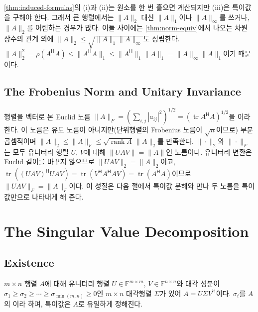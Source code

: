 \cref{thm:induced-formulas}의 (i)과 (ii)는 원소를 한 번 훑으면 계산되지만 (iii)은 특이값을 구해야 한다. 그래서 큰 행렬에서는 $\|A\|_2$ 대신 $\|A\|_1$이나 $\|A\|_\infty$를 쓰거나, $\|A\|_2$를 어림하는 경우가 많다. 이들 사이에는 \cref{thm:norm-equiv}에서 나오는 차원 상수의 관계 외에 $\|A\|_2\le\sqrt{\|A\|_1\|A\|_\infty}$도 성립한다. $\|A\|_2^2=\rho(A^{\mathsf H}A)\le\|A^{\mathsf H}A\|_1\le\|A^{\mathsf H}\|_1\|A\|_1=\|A\|_\infty\|A\|_1$이기 때문이다.

\subsection{The Frobenius Norm and Unitary Invariance}

행렬을 벡터로 본 Euclid 노름 $\|A\|_F=(\sum_{i,j}|a_{ij}|^2)^{1/2}=(\operatorname{tr}A^{\mathsf H}A)^{1/2}$을 이라 한다. 이 노름은 유도 노름이 아니지만(단위행렬의 Frobenius 노름이 $\sqrt n$이므로) 부분곱셈적이며 $\|A\|_2\le\|A\|_F\le\sqrt{\operatorname{rank}A}\,\|A\|_2$를 만족한다. $\|\cdot\|_2$와 $\|\cdot\|_F$는 모두 유니터리 행렬 $U$, $V$에 대해 $\|UAV\|=\|A\|$인  노름이다. 유니터리 변환은 Euclid 길이를 바꾸지 않으므로 $\|UAV\|_2=\|A\|_2$이고, $\operatorname{tr}((UAV)^{\mathsf H}UAV)=\operatorname{tr}(V^{\mathsf H}A^{\mathsf H}AV)=\operatorname{tr}(A^{\mathsf H}A)$이므로 $\|UAV\|_F=\|A\|_F$이다. 이 성질은 다음 절에서 특이값 분해와 만나 두 노름을 특이값만으로 나타내게 해 준다.

\section{The Singular Value Decomposition}
\label{sec:svd}

\subsection{Existence}

\begin{theorem}[특이값 분해]
\label{thm:svd}
$m\times n$ 행렬 $A$에 대해 유니터리 행렬 $U\in\mathbb{F}^{m\times m}$, $V\in\mathbb{F}^{n\times n}$와 대각 성분이 $\sigma_1\ge\sigma_2\ge\cdots\ge\sigma_{\min(m,n)}\ge0$인 $m\times n$ 대각행렬 $\Sigma$가 있어 $A=U\Sigma V^{\mathsf H}$이다. $\sigma_i$를 $A$의 이라 하며, 특이값은 $A$로 유일하게 정해진다.
\end{theorem}


